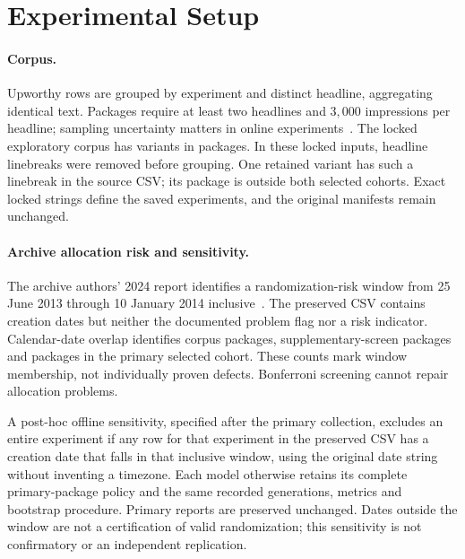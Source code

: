 \section{Experimental Setup}
\paragraph{Corpus.}
Upworthy rows are grouped by experiment and distinct headline, aggregating identical text.
Packages require at least two headlines and $3{,}000$ impressions per headline; sampling uncertainty
matters in online experiments~\citep{kohavi2009controlled}. The locked exploratory corpus has
\sensNVariants{} variants in \sensNPackages{} packages. In these locked inputs, headline linebreaks
were removed before grouping. One retained variant has such a linebreak in the source CSV; its
package is outside both selected cohorts. Exact locked strings define the saved experiments,
and the original manifests remain unchanged.

\paragraph{Archive allocation risk and sensitivity.}
The archive authors' 2024 report identifies a randomization-risk window from 25 June 2013
through 10 January 2014 inclusive~\citep{matias2024correction}. The preserved CSV contains creation dates but neither the documented problem flag nor a
risk indicator. Calendar-date overlap identifies \riskCorpusN{} corpus packages, \riskLegacyN{}
supplementary-screen packages and \riskSelectedN{} packages in the primary selected cohort.
These counts mark window membership, not individually proven defects. Bonferroni screening
cannot repair allocation problems.

A post-hoc offline sensitivity, specified after the primary collection, excludes an entire experiment if any row for that experiment in the preserved CSV has a
creation date that falls
in that inclusive window, using the original date string without inventing a timezone. Each
model otherwise retains its complete primary-package policy and the same recorded generations,
metrics and bootstrap procedure. Primary reports are preserved unchanged. Dates outside the
window are not a certification of valid randomization; this sensitivity is not confirmatory
or an independent replication.

